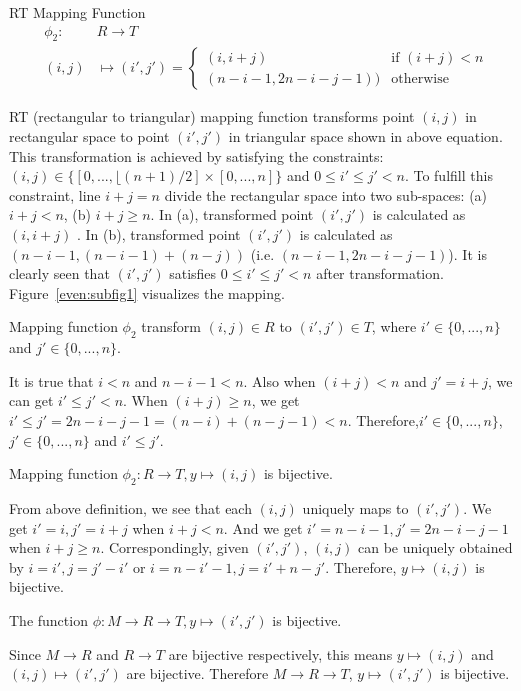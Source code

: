 \documentclass[AMA,LATO1COL]{WileyNJD-v2}
\begin{document}
\begin{definition}
RT Mapping Function
\begin{eqnarray}
&\phi_2:&   R \rightarrow  T  \\
&(i,j)& \mapsto (i',j')=
  \begin{cases}
   (i,i+j) & \text{if } (i+j) < n \\
   (n-i-1,2n-i-j-1)) & \text{otherwise}
  \end{cases}
\end{eqnarray}
\end{definition}
RT (rectangular to triangular) mapping function transforms point $(i,j)$ in rectangular space to point $(i',j')$ in triangular space shown in above equation. This transformation is achieved by satisfying the constraints: $(i,j)\in \{[0,...,\lfloor (n+1)/2] \times [0,...,n]\}$ and $0\leq i' \leq j'<n$. To fulfill this constraint, line $i+j=n$ divide the rectangular space into two sub-spaces: (a) $i+j<n$, (b) $i+j\geq n$. In (a), transformed point $(i',j')$ is calculated as $(i,i+j)$ . In (b), transformed point $(i',j')$ is calculated as $(n-i-1,(n-i-1)+(n-j))$ (i.e. $(n-i-1,2n-i-j-1)$). It is clearly seen that $(i',j')$ satisfies $0\leq i' \leq j'<n$ after transformation. Figure~\ref{even:subfig1} visualizes the mapping.

\vspace{5mm}
\begin{lemma}
Mapping function $\phi_2$ transform $(i,j) \in R$ to $(i',j')\in T $, where $i' \in \{0,...,n\}$ and $j' \in \{0,...,n\}$.
\end{lemma}
It is true that $i<n$ and $n-i-1<n$. Also when $(i+j) < n$ and $j'=i+j$, we can get $i'\leq j'<n$. When $(i+j) \geq n$, we get $i'\leq j'=2n-i-j-1=(n-i)+(n-j-1)<n$. Therefore,$i' \in \{0,...,n\}$, $j' \in \{0,...,n\}$ and $i'\leq j'$.
\vspace{5mm}
\begin{lemma}
Mapping function $\phi_2:   R \rightarrow  T,y \mapsto (i,j)$ is bijective.
\end{lemma}
From above definition, we see that each $(i,j)$ uniquely maps to $(i',j')$. We get $i'=i, j'=i+j$ when $i+j<n$. And we get $i'=n-i-1, j'=2n-i-j-1$ when $i+j\geq n$. Correspondingly,  given $(i',j')$, $(i,j)$ can be uniquely obtained by $i=i', j=j'-i'$ or $i=n-i'-1, j=i'+n-j'$. Therefore, $y \mapsto (i,j)$ is bijective.
\vspace{5mm}
\begin{corollary}
The function $\phi:   M  \rightarrow R \rightarrow  T,y \mapsto (i',j')$ is bijective.
\end{corollary}
Since $M  \rightarrow R$ and $R \rightarrow  T$ are bijective respectively, this means $y \mapsto (i,j)$ and $(i,j) \mapsto (i',j')$ are bijective. Therefore $ M  \rightarrow R \rightarrow  T$,  $y \mapsto (i',j')$ is bijective.
\vspace{5mm}
\end{document}
